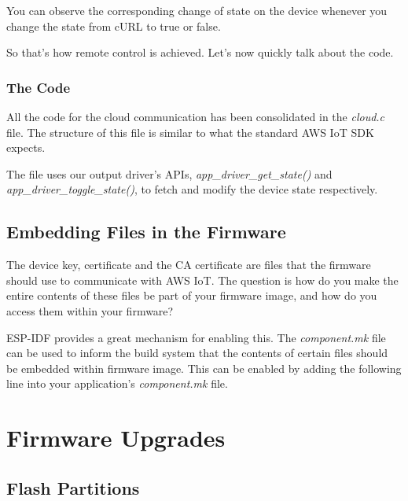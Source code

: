 \documentclass[11pt,fleqn]{book} %
\begin{document}
You can observe the corresponding change of state on the device whenever you change the state from cURL to true or false.

So that's how remote control is achieved. Let's now quickly talk about the code.

\subsection{The Code}
All the code for the cloud communication has been consolidated in the \textit{cloud.c} file. The structure of this file is similar to what the standard AWS IoT SDK expects. 

The file uses our output driver's APIs, \textit{app\_driver\_get\_state()} and \textit{app\_driver\_toggle\_state()}, to fetch and modify the device state respectively.


\section{Embedding Files in the Firmware}
The device key, certificate and the CA certificate are files that the firmware should use to communicate with AWS IoT. The question is how do you make the entire contents of these files be part of your firmware image, and how do you access them within your firmware?

ESP-IDF provides a great mechanism for enabling this. The \textit{component.mk} file can be used to inform the build system that the contents of certain files should be embedded within firmware image. This can be enabled by adding the following line into your application's \textit{component.mk} file.




\chapter{Firmware Upgrades}

\section{Flash Partitions}
\end{document}
